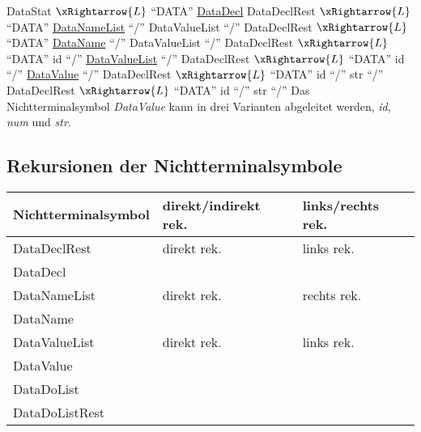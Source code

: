 \documentclass[11pt, a4paper, twoside]{article}   	%
\newenvironment{code}{\captionsetup{type=listing}}{}
\begin{document}
\parindent0pt DataStat $\xRightarrow{L}$ \enquote{DATA} \underline{DataDecl} DataDeclRest
\newline
\null\hspace{1.55cm} $\xRightarrow{L}$ \enquote{DATA} \underline{DataNameList} \enquote{/} DataValueList \enquote{/} DataDeclRest
\newline
\null\hspace{1.55cm} $\xRightarrow{L}$ \enquote{DATA} \underline{DataName} \enquote{/} DataValueList \enquote{/} DataDeclRest
\newline
\null\hspace{1.55cm} $\xRightarrow{L}$ \enquote{DATA} id \enquote{/} \underline{DataValueList} \enquote{/} DataDeclRest
\newline
\null\hspace{1.55cm} $\xRightarrow{L}$ \enquote{DATA} id \enquote{/} \underline{DataValue} \enquote{/} DataDeclRest
\newline
\null\hspace{1.55cm} $\xRightarrow{L}$ \enquote{DATA} id \enquote{/} str  \enquote{/} DataDeclRest
\newline
\null\hspace{1.55cm} $\xRightarrow{L}$ \enquote{DATA} id \enquote{/} str  \enquote{/}
\newline
\newline
Das Nichtterminalsymbol \emph{DataValue} kann in drei Varianten abgeleitet werden, \emph{id}, \emph{num} und \emph{str}. 

\subsection{Rekursionen der Nichtterminalsymbole}
    \begin{tabularx}{\textwidth}{|>{\centering}X|>{\centering}X|>{\centering\arraybackslash}X|}
    \hline
    \textbf{Nichtterminalsymbol} & \textbf{direkt/indirekt rek.} & \textbf{links/rechts rek.} \\ \hline
    DataDeclRest                 &           direkt rek.         &           links rek.\\ \hline
    DataDecl                     &                               & \\ \hline
    DataNameList                 &           direkt rek.         &           rechts rek. \\ \hline
    DataName                     &                               & \\ \hline
    DataValueList                &           direkt rek.         &           links rek. \\ \hline
    DataValue                    &                               & \\ \hline
    DataDoList                   &                               & \\ \hline
    DataDoListRest               &                               & \\ \hline
    \end{tabularx}

\end{document}
